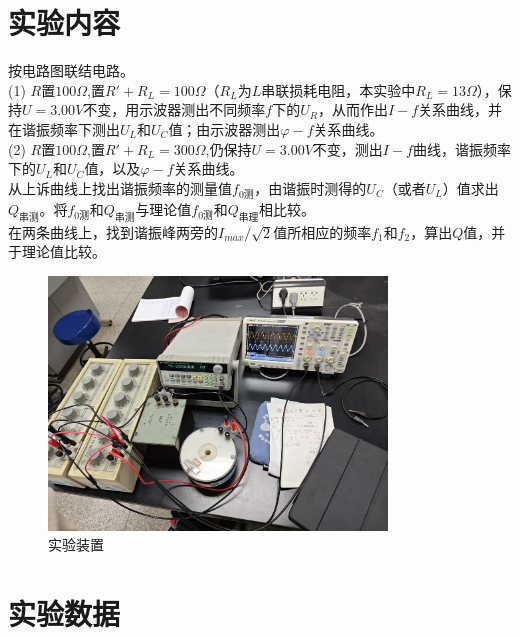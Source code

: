\documentclass{article}
\begin{document}
\section{实验内容}
\hspace*{2em}按电路图联结电路。\\
\hspace*{2em}(1) $R$置$100\Omega $,置$R'+R_L=100\Omega$（$R_L$为$L$串联损耗电阻，本实验中$R_L=13\Omega$），保持$U=3.00V$不变，用示波器测出不同频率$f$下的$U_R$，从而作出$I-f$关系曲线，并在谐振频率下测出$U_L$和$U_C$值；由示波器测出$\varphi -f$关系曲线。\\
\hspace*{2em}(2) $R$置$100\Omega $,置$R'+R_L=300\Omega$,仍保持$U=3.00V$不变，测出$I-f$曲线，谐振频率下的$U_L$和$U_C$值，以及$\varphi -f$关系曲线。\\
\hspace*{2em}从上诉曲线上找出谐振频率的测量值$f_{0测}$，由谐振时测得的$U_C$（或者$U_L$）值求出$Q_{串测}$。将$f_{0测}$和$Q_{串测}$与理论值$f_{0测}$和$Q_{串理}$相比较。\\
\hspace*{2em} 在两条曲线上，找到谐振峰两旁的$I_{max}/\sqrt{2}$值所相应的频率$f_1$和$f_2$，算出$Q$值，并于理论值比较。

\begin{figure}[!h]
    \centering
    \includegraphics[width=9cm]{123.jpg}
    \caption{实验装置}
\end{figure}

\section{实验数据}
\end{document}
